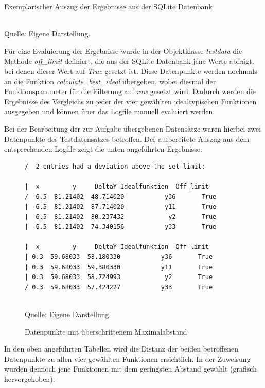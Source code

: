 \begin{table}[H]
\small
\centering
\caption{Exemplarischer Auszug der Ergebnisse aus der SQLite Datenbank}
\\
Quelle: Eigene Darstellung.
\label{tab:sqlitetest.csv}
\end{table} 

Für eine Evaluierung der Ergebnisse wurde in der Objektklasse \emph{testdata} die Methode \emph{off\_limit} definiert, die aus der SQLite Datenbank jene Werte abfrägt, bei denen dieser Wert auf \emph{True} gesetzt ist. Diese Datenpunkte werden nochmals an die Funktion \emph{calculate\_best\_ideal} übergeben, wobei diesmal der Funktionsparameter für die Filterung auf \emph{raw} gesetzt wird. Dadurch werden die Ergebnisse des Vergleichs zu jeder der vier gewählten idealtypischen Funktionen ausgegeben und können über das Logfile manuell evaluiert werden.

Bei der Bearbeitung der zur Aufgabe übergebenen Datensätze waren hierbei zwei Datenpunkte des Testdatensatzes betroffen. Der aufbereitete Auszug aus dem entsprechenden Logfile zeigt die unten angeführten Ergebnisse:

\begin{figure}[h]
\caption{Datenpunkte mit überschrittenem Maximalabstand}
\begin{tabular}
\begin{lstlisting}[label=offlimit]
/  2 entries had a deviation above the set limit:

|  x         y     DeltaY Idealfunktion  Off_limit
/ -6.5  81.21402  48.714020           y36       True
| -6.5  81.21402  87.714020           y11       True
| -6.5  81.21402  80.237432            y2       True
| -6.5  81.21402  74.340156           y33       True

|  x         y     DeltaY Idealfunktion  Off_limit
| 0.3  59.68033  58.180330           y36       True
| 0.3  59.68033  59.380330           y11       True
| 0.3  59.68033  58.724993            y2       True
/ 0.3  59.68033  57.424227           y33       True
\end{lstlisting}
\end{tabular}\\
\centering
Quelle: Eigene Darstellung.
\label{fig:offlimit}
\end{figure}

In den oben angeführten Tabellen wird die Distanz der beiden betroffenen Datenpunkte zu allen vier gewählten Funktionen ersichtlich. In der Zuweisung wurden dennoch jene Funktionen mit dem geringsten Abstand gewählt (grafisch hervorgehoben).

